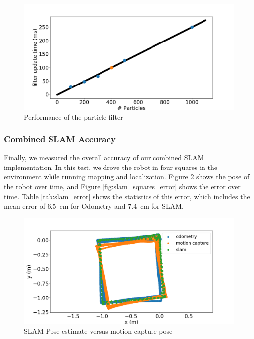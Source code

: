 \documentclass[journal]{IEEEtran}
\begin{document}
            \begin{figure}[h]
                \centering
                \includegraphics[width=0.85\linewidth]{filter_perf.png}
                \caption{Performance of the particle filter}
                \label{fig:perf}
            \end{figure}
            
        \subsubsection{Combined SLAM Accuracy}
        
            Finally, we measured the overall accuracy of our combined SLAM implementation. In this test, we drove the robot in four squares in the environment while running mapping and localization. Figure \ref{fig:slam_squares} shows the pose of the robot over time, and Figure \ref{fig:slam_squares_error} shows the error over time. Table \ref{tab:slam_error} shows the statistics of this error, which includes the mean error of \SI{6.5}{\centi\meter} for Odometry and \SI{7.4}{\centi\meter} for SLAM.
            
            \begin{figure}[ht]
                \centering
                \includegraphics[width=1\linewidth]{slam_squares.png}
                \caption{SLAM Pose estimate versus motion capture pose}
                \label{fig:slam_squares}
            \end{figure}
            
\end{document}

